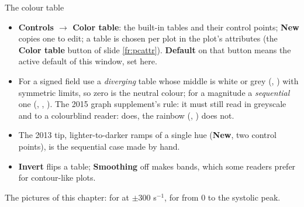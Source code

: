 \documentclass[aspectratio=169,11pt]{beamer}
\newcommand{\gui}[1]{\textsf{\textbf{#1}}}
\begin{document}
\begin{frame}{The colour table}
\label{fr:ctable}
\footnotesize
\begin{itemize}
  \item \gui{Controls $\to$ Color table}: the built-in tables and their control points; \gui{New} copies one to edit; a table is chosen per plot in the plot's attributes (the \gui{Color table} button of slide \ref{fr:pcattr}). \gui{Default} on that button means the active default of this window, set here.
  \item For a signed field use a \emph{diverging} table whose middle is white or grey (, ) with symmetric limits, so zero is the neutral colour; for a magnitude a \emph{sequential} one (, , ). The 2015 graph supplement's rule: it must still read in greyscale and to a colourblind reader:  does, the rainbow (, ) does not.
  \item The 2013 tip, lighter-to-darker ramps of a single hue (\gui{New}, two control points), is the sequential case made by hand.
  \item \gui{Invert} flips a table; \gui{Smoothing} off makes bands, which some readers prefer for contour-like plots.
\end{itemize}
\begin{punchbox}
\scriptsize The pictures of this chapter:  for  at $\pm300$ s$^{-1}$,  for  from 0 to the systolic peak.
\end{punchbox}
\end{frame}
\end{document}
